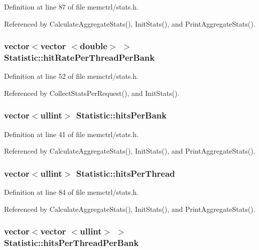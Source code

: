 Definition at line 87 of file memctrl/stats.h.

Referenced by CalculateAggregateStats(), InitStats(), and PrintAggregateStats().
\subsubsection[{hitRatePerThreadPerBank}]{\setlength{\rightskip}{0pt plus 5cm}vector$<$vector $<$double$>$ $>$ {\bf Statistic::hitRatePerThreadPerBank}}\label{classStatistic_ac7957f69f9285e71614b681952a87d2}




Definition at line 52 of file memctrl/stats.h.

Referenced by CollectStatsPerRequest(), and InitStats().
\subsubsection[{hitsPerBank}]{\setlength{\rightskip}{0pt plus 5cm}vector$<${\bf ullint}$>$ {\bf Statistic::hitsPerBank}}\label{classStatistic_482bf760b57918367291d9d0b98699c6}




Definition at line 41 of file memctrl/stats.h.

Referenced by CalculateAggregateStats(), InitStats(), and PrintAggregateStats().
\subsubsection[{hitsPerThread}]{\setlength{\rightskip}{0pt plus 5cm}vector$<${\bf ullint}$>$ {\bf Statistic::hitsPerThread}}\label{classStatistic_7d079fafb4363657d72765bd3bf6582b}




Definition at line 84 of file memctrl/stats.h.

Referenced by CalculateAggregateStats(), InitStats(), and PrintAggregateStats().
\subsubsection[{hitsPerThreadPerBank}]{\setlength{\rightskip}{0pt plus 5cm}vector$<$vector $<${\bf ullint}$>$ $>$ {\bf Statistic::hitsPerThreadPerBank}}\label{classStatistic_99584499b1147d8b5351f2ed20d96bba}




